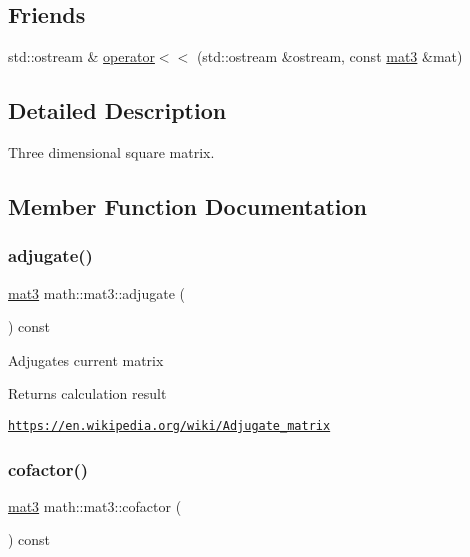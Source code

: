 \subsection*{Friends}
\begin{DoxyCompactItemize}
\item 
std\+::ostream \& \hyperlink{structmath_1_1mat3_a1c28931c2fc172608795255611dea691}{operator$<$$<$} (std\+::ostream \&ostream, const \hyperlink{structmath_1_1mat3}{mat3} \&mat)
\end{DoxyCompactItemize}


\subsection{Detailed Description}
Three dimensional square matrix. 

\subsection{Member Function Documentation}
\mbox{\label{structmath_1_1mat3_a382378d1fb1e2fd8201da87ccb63f3e8}} 
\subsubsection{\texorpdfstring{adjugate()}{adjugate()}}
{\footnotesize\ttfamily \hyperlink{structmath_1_1mat3}{mat3} math\+::mat3\+::adjugate (\begin{DoxyParamCaption}{ }\end{DoxyParamCaption}) const\hspace{0.3cm}{\ttfamily [inline]}}

Adjugates current matrix \begin{DoxyReturn}{Returns}
calculation result
\end{DoxyReturn}
\href{https://en.wikipedia.org/wiki/Adjugate_matrix}{\tt https\+://en.\+wikipedia.\+org/wiki/\+Adjugate\+\_\+matrix} \mbox{\label{structmath_1_1mat3_a5b556e78be410428a8e74036fb6b8529}} 
\subsubsection{\texorpdfstring{cofactor()}{cofactor()}}
{\footnotesize\ttfamily \hyperlink{structmath_1_1mat3}{mat3} math\+::mat3\+::cofactor (\begin{DoxyParamCaption}{ }\end{DoxyParamCaption}) const\hspace{0.3cm}{\ttfamily [inline]}}

